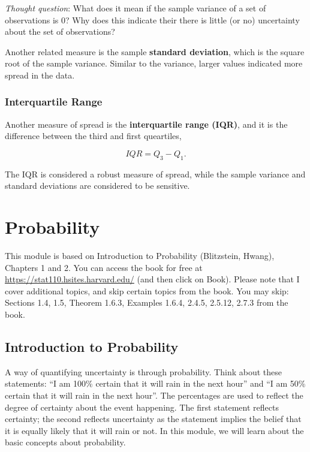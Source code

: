 \documentclass[
]{book}
\begin{document}
\emph{Thought question}: What does it mean if the sample variance of a set of observations is 0? Why does this indicate their there is little (or no) uncertainty about the set of observations?

Another related measure is the sample \textbf{standard deviation}, which is the square root of the sample variance. Similar to the variance, larger values indicated more spread in the data.

\subsection{Interquartile Range}\label{interquartile-range}

Another measure of spread is the \textbf{interquartile range (IQR)}, and it is the difference between the third and first queartiles,

\begin{equation} 
IQR = Q_3 - Q_1.
\label{eq:IQR}
\end{equation}

The IQR is considered a robust measure of spread, while the sample variance and standard deviations are considered to be sensitive.

\chapter{Probability}\label{probability}

This module is based on Introduction to Probability (Blitzstein, Hwang), Chapters 1 and 2. You can access the book for free at \url{https://stat110.hsites.harvard.edu/} (and then click on Book). Please note that I cover additional topics, and skip certain topics from the book. You may skip: Sections 1.4, 1.5, Theorem 1.6.3, Examples 1.6.4, 2.4.5, 2.5.12, 2.7.3 from the book.

\section{Introduction to Probability}\label{introduction-to-probability}

A way of quantifying uncertainty is through probability. Think about these statements: ``I am 100\% certain that it will rain in the next hour'' and ``I am 50\% certain that it will rain in the next hour''. The percentages are used to reflect the degree of certainty about the event happening. The first statement reflects certainty; the second reflects uncertainty as the statement implies the belief that it is equally likely that it will rain or not. In this module, we will learn about the basic concepts about probability.
\end{document}
